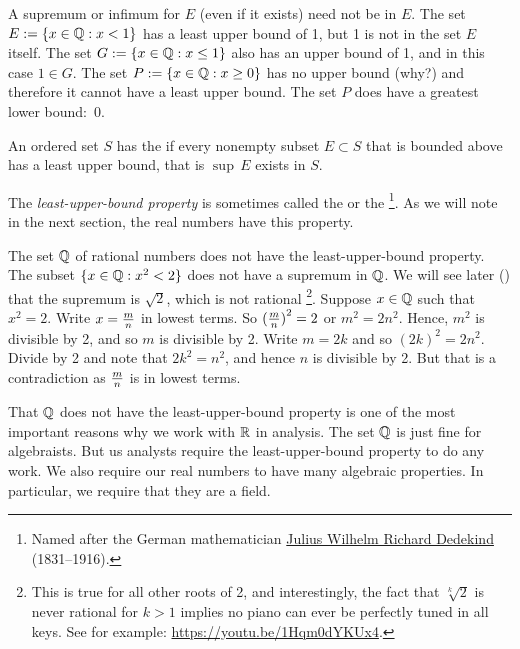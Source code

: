 A supremum or infimum for $E$ (even if it exists) need not be
in $E$.  The set $E := \{ x \in \Q : x < 1 \}$ has a least upper
bound of 1, but 1 is not in the set $E$ itself.
The set 
$G := \{ x \in \Q : x \leq 1 \}$ also has an upper bound of 1,
and in this case $1 \in G$.  
The set $P := \{ x \in \Q : x \geq 0 \}$ has no upper bound (why?) and therefore
it cannot have a least upper bound.  The set $P$ does have a greatest lower
bound:~0.

\begin{defn} \label{defn:lub}
An ordered set $S$ has the \emph{} if
every nonempty
subset $E \subset S$ that is bounded above has a least upper bound,
that is $\sup\, E$ exists in $S$.
\end{defn}

The \emph{least-upper-bound property}
is sometimes called the \emph{} or the
\emph{}%
\footnote{%
Named after the German mathematician
\href{https://en.wikipedia.org/wiki/Richard_Dedekind}{Julius Wilhelm Richard Dedekind}
(1831--1916).}.
As we will note in the
next section, the real numbers have this property.

\begin{example}
The set $\Q$ of rational numbers does not have the least-upper-bound property.  The subset
$\{ x \in \Q : x^2 < 2 \}$ does not have a supremum in $\Q$.  We will
see later () that the supremum is 
$\sqrt{2}$, which is not rational%
\footnote{This is true for all other roots of 2, and interestingly,
the fact that $\sqrt[k]{2}$ is never rational for $k > 1$ implies no piano can
ever be perfectly tuned in all keys.  See for example:
\url{https://youtu.be/1Hqm0dYKUx4}.}.
Suppose $x \in \Q$ such that $x^2 = 2$.
Write $x=\nicefrac{m}{n}$ in lowest terms.  So ${(\nicefrac{m}{n})}^2 = 2$
or
$m^2 = 2n^2$.  Hence, $m^2$ is divisible by 2, and so $m$ is divisible by
2.  Write $m = 2k$ and so ${(2k)}^2 = 2n^2$.  Divide by 2
and note that $2k^2 = n^2$, and hence $n$ is divisible by 2.  But that is a
contradiction as $\nicefrac{m}{n}$ is in lowest terms.
\end{example}

That $\Q$ does not have the least-upper-bound property is one of the most
important reasons why we work with $\R$ in analysis.  The set $\Q$
is just fine for algebraists.  But us analysts require the least-upper-bound
property to do any work.
We also require our real numbers to have many algebraic properties.  In
particular, we require that they are a field.


